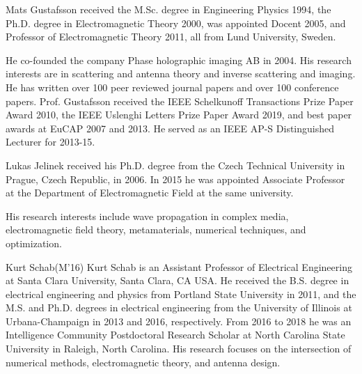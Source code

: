 \documentclass[journal]{IEEEtran}
\begin{document}




\begin{IEEEbiography}{Mats Gustafsson}
received the M.Sc. degree in Engineering Physics 1994, the Ph.D. degree in Electromagnetic Theory 2000, was appointed Docent 2005, and Professor of Electromagnetic Theory 2011, all from Lund University, Sweden.

He co-founded the company Phase holographic imaging AB in 2004. His research interests are in scattering and antenna theory and inverse scattering and imaging. He has written over 100 peer reviewed journal papers and over 100 conference papers. Prof. Gustafsson received the IEEE Schelkunoff Transactions Prize Paper Award 2010, the IEEE Uslenghi Letters Prize Paper Award 2019, and best paper awards at EuCAP 2007 and 2013. He served as an IEEE AP-S Distinguished Lecturer for 2013-15.
\end{IEEEbiography}

\begin{IEEEbiography}{Lukas Jelinek}
received his Ph.D. degree from the Czech Technical University in Prague, Czech Republic, in 2006. In 2015 he was appointed Associate Professor at the Department of Electromagnetic Field at the same university.

His research interests include wave propagation in complex media, electromagnetic field theory, metamaterials, numerical techniques, and optimization.
\end{IEEEbiography}

\begin{IEEEbiography}{Kurt Schab}(M'16)
Kurt Schab is an Assistant Professor of Electrical Engineering at Santa Clara University, Santa Clara, CA USA. He received the B.S. degree in electrical engineering and physics from Portland State University in 2011, and the M.S. and Ph.D. degrees in electrical engineering from the University of Illinois at Urbana-Champaign in 2013 and 2016, respectively.  From 2016 to 2018 he was an Intelligence Community Postdoctoral Research Scholar at North Carolina State University in Raleigh, North Carolina.  His research focuses on the intersection of numerical methods, electromagnetic theory, and antenna design.  
\end{IEEEbiography}
\end{document}
